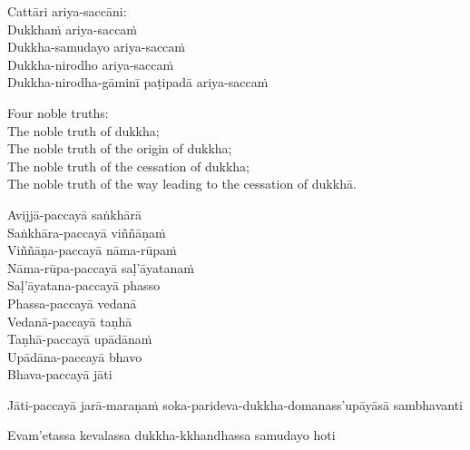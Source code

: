 \begin{pali-hang-continued}
  Cattāri ariya-saccāni:\\
  Dukkhaṁ ariya-saccaṁ\\
  Dukkha-samudayo ariya-saccaṁ\\
  Dukkha-nirodho ariya-saccaṁ\\
  Dukkha-nirodha-gāminī paṭipadā ariya-saccaṁ
\end{pali-hang-continued}

\begin{english-verses}
  Four noble truths:\\
  The noble truth of dukkha;\\
  The noble truth of the origin of dukkha;\\
  The noble truth of the cessation of dukkha;\\
  The noble truth of the way leading to the cessation of dukkhā.
\end{english-verses}

\suttaRef{[SN 56.24]}

\begin{pali-hang-continued}
  Avijjā-paccayā saṅkhārā\\
  Saṅkhāra-paccayā viññāṇaṁ\\
  Viññāṇa-paccayā nāma-rūpaṁ\\
  Nāma-rūpa-paccayā saḷ'āyatanaṁ\\
  Saḷ'āyatana-paccayā phasso\\
  Phassa-paccayā vedanā\\
  Vedanā-paccayā taṇhā\\
  Taṇhā-paccayā upādānaṁ\\
  Upādāna-paccayā bhavo\\
  Bhava-paccayā jāti\\
  \begin{pali-hangtogether}
    Jāti-paccayā jarā-maraṇaṁ soka-parideva-dukkha-domanass'upāyāsā sambhavanti
  \end{pali-hangtogether}
  \begin{pali-hangtogether}
    Evam'etassa kevalassa dukkha-kkhandhassa samudayo hoti
  \end{pali-hangtogether}
\end{pali-hang-continued}

